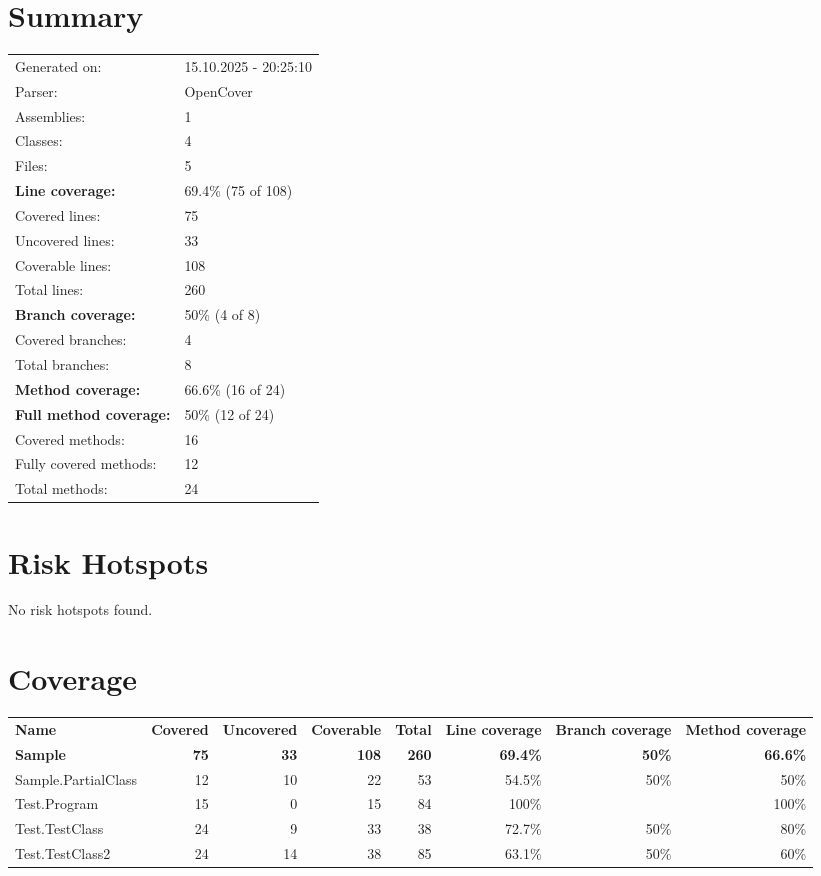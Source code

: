 \documentclass[a4paper,landscape,10pt]{article}
\begin{document}
\setcounter{secnumdepth}{-1}
\section{Summary}
\begin{longtable}[l]{ll}
Generated on: & 15.10.2025 - 20:25:10\\
Parser: & OpenCover\\
Assemblies: & 1\\
Classes: & 4\\
Files: & 5\\
\textbf{Line coverage:} & 69.4\% (75 of 108)\\
Covered lines: & 75\\
Uncovered lines: & 33\\
Coverable lines: & 108\\
Total lines: & 260\\
\textbf{Branch coverage:} & 50\% (4 of 8)\\
Covered branches: & 4\\
Total branches: & 8\\
\textbf{Method coverage:} & 66.6\% (16 of 24)\\
\textbf{Full method coverage:} & 50\% (12 of 24)\\
Covered methods: & 16\\
Fully covered methods: & 12\\
Total methods: & 24\\
\end{longtable}
\section{Risk Hotspots}
No risk hotspots found.
\section{Coverage}
\begin{longtable}[l]{|l|r|r|r|r|r|r|r|}
\textbf{Name} & \textbf{Covered} & \textbf{Uncovered} & \textbf{Coverable} & \textbf{Total} & \textbf{Line coverage} & \textbf{Branch coverage} & \textbf{Method coverage}\\
\textbf{Sample} & \textbf{75} & \textbf{33} & \textbf{108} & \textbf{260} & \textbf{69.4\%} & \textbf{50\%} & \textbf{66.6\%}\\
Sample.PartialClass & 12 & 10 & 22 & 53 & 54.5\% & 50\% & 50\%\\
Test.Program & 15 & 0 & 15 & 84 & 100\% &  & 100\%\\
Test.TestClass & 24 & 9 & 33 & 38 & 72.7\% & 50\% & 80\%\\
Test.TestClass2 & 24 & 14 & 38 & 85 & 63.1\% & 50\% & 60\%\\
\end{longtable}
\end{document}
